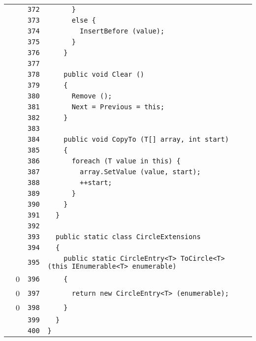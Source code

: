 \documentclass[a4paper,10pt]{article}
\begin{document}
\begin{longtable}[l]{lrrl}
\cellcolor{gray} &  & \verb~372~ & \verb~      }~\\
\cellcolor{gray} &  & \verb~373~ & \verb~      else {~\\
\cellcolor{gray} &  & \verb~374~ & \verb~        InsertBefore (value);~\\
\cellcolor{gray} &  & \verb~375~ & \verb~      }~\\
\cellcolor{gray} &  & \verb~376~ & \verb~    }~\\
\cellcolor{gray} &  & \verb~377~ & \verb~~\\
\cellcolor{gray} &  & \verb~378~ & \verb~    public void Clear ()~\\
\cellcolor{gray} &  & \verb~379~ & \verb~    {~\\
\cellcolor{gray} &  & \verb~380~ & \verb~      Remove ();~\\
\cellcolor{gray} &  & \verb~381~ & \verb~      Next = Previous = this;~\\
\cellcolor{gray} &  & \verb~382~ & \verb~    }~\\
\cellcolor{gray} &  & \verb~383~ & \verb~~\\
\cellcolor{gray} &  & \verb~384~ & \verb~    public void CopyTo (T[] array, int start)~\\
\cellcolor{gray} &  & \verb~385~ & \verb~    {~\\
\cellcolor{gray} &  & \verb~386~ & \verb~      foreach (T value in this) {~\\
\cellcolor{gray} &  & \verb~387~ & \verb~        array.SetValue (value, start);~\\
\cellcolor{gray} &  & \verb~388~ & \verb~        ++start;~\\
\cellcolor{gray} &  & \verb~389~ & \verb~      }~\\
\cellcolor{gray} &  & \verb~390~ & \verb~    }~\\
\cellcolor{gray} &  & \verb~391~ & \verb~  }~\\
\cellcolor{gray} &  & \verb~392~ & \verb~~\\
\cellcolor{gray} &  & \verb~393~ & \verb~  public static class CircleExtensions~\\
\cellcolor{gray} &  & \verb~394~ & \verb~  {~\\
\cellcolor{gray} &  & \verb~395~ & \verb~    public static CircleEntry<T> ToCircle<T> (this IEnumerable<T> enumerable)~\\
\cellcolor{red} & 0 & \verb~396~ & \verb~    {~\\
\cellcolor{red} & 0 & \verb~397~ & \verb~      return new CircleEntry<T> (enumerable);~\\
\cellcolor{red} & 0 & \verb~398~ & \verb~    }~\\
\cellcolor{gray} &  & \verb~399~ & \verb~  }~\\
\cellcolor{gray} &  & \verb~400~ & \verb~}~\\
\end{longtable}
\newpage
\end{document}
